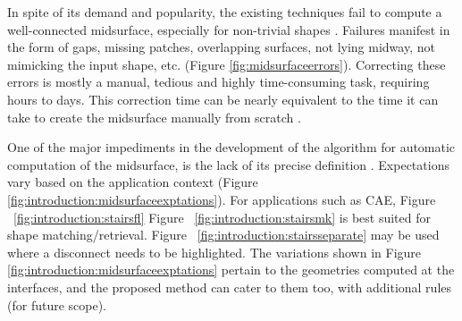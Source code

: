 In spite of its demand and popularity, the existing techniques  fail to compute a well-connected midsurface, especially for non-trivial shapes \cite{ Robinson2006, Stolt2006, Lockett2008}. Failures manifest in the form of gaps, missing patches, overlapping surfaces, not lying midway, not mimicking the input shape, etc. (Figure \ref{fig:midsurfaceerrors}). Correcting these errors is mostly a manual, tedious and highly time-consuming task, requiring hours to days. This correction time can be nearly equivalent to the time it can take to create the midsurface manually from scratch \cite{Stolt2006}. 

One of the major impediments in the development of the algorithm for automatic computation of the midsurface, is the lack of its precise definition \cite{Ramanathan2004}.  Expectations vary based on the application context (Figure \ref{fig:introduction:midsurfaceexptations}). For applications such as CAE, Figure ~\ref{fig:introduction:stairsfl}  Figure ~\ref{fig:introduction:stairsmk} is best suited for  shape matching/retrieval. Figure ~\ref{fig:introduction:stairsseparate} may be used where a disconnect needs to be highlighted. The variations shown in Figure \ref{fig:introduction:midsurfaceexptations} pertain to the geometries computed  at the interfaces, and the proposed method can cater to them too, with additional rules (for future scope). 

\def \myfigstairspcolumnwidth{0.2}

